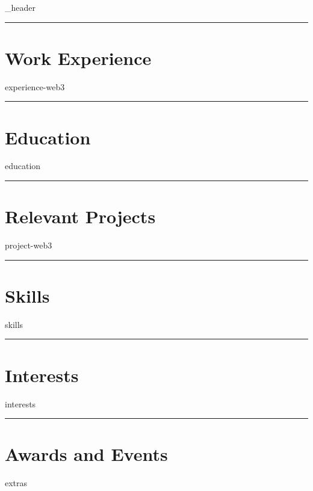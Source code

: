 \documentclass[letter,10pt]{article}
\author{Guilherme Lopes}
\begin{document}
{_header}
\vspace*{10pt}
\hrule
\vspace*{6pt}


\section{\textbf{Work Experience}}
\vspace*{3pt}
{experience-web3}
\vspace*{6pt}
\hrule

\section{\textbf{Education}}
\vspace*{3pt}
{education}
\vspace*{6pt}
\hrule
\vspace*{6pt}

\section{\textbf{Relevant Projects}}
\vspace*{3pt}
{project-web3}
\vspace*{6pt}
\hrule
\vspace*{6pt}

\section{\textbf{Skills}}
\vspace*{3pt}
{skills}
\vspace*{6pt}
\hrule

\section{\textbf{Interests}}
\vspace*{3pt}
{interests}
\vspace*{6pt}
\hrule

\section{\textbf{Awards and Events}}
\vspace*{3pt}
{extras}
\end{document}

